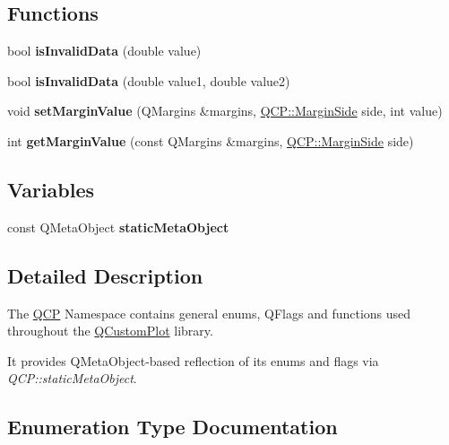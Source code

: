\subsection*{Functions}
\begin{DoxyCompactItemize}
\item 
\mbox{\label{namespaceQCP_a07ab701c05329089f933b9cae2638a63}} 
bool {\bfseries is\+Invalid\+Data} (double value)
\item 
\mbox{\label{namespaceQCP_a728903e5c3dd17847bee280f4005496f}} 
bool {\bfseries is\+Invalid\+Data} (double value1, double value2)
\item 
\mbox{\label{namespaceQCP_afbf6e3084c108f2bb4372107945ee82f}} 
void {\bfseries set\+Margin\+Value} (Q\+Margins \&margins, \hyperlink{namespaceQCP_a7e487e3e2ccb62ab7771065bab7cae54}{Q\+C\+P\+::\+Margin\+Side} side, int value)
\item 
\mbox{\label{namespaceQCP_a23a2679d3495c444acc26acc61e35b5b}} 
int {\bfseries get\+Margin\+Value} (const Q\+Margins \&margins, \hyperlink{namespaceQCP_a7e487e3e2ccb62ab7771065bab7cae54}{Q\+C\+P\+::\+Margin\+Side} side)
\end{DoxyCompactItemize}
\subsection*{Variables}
\begin{DoxyCompactItemize}
\item 
\mbox{\label{namespaceQCP_a07ffa1eb1537a3b1f218ff2a442b2017}} 
const Q\+Meta\+Object {\bfseries static\+Meta\+Object}
\end{DoxyCompactItemize}


\subsection{Detailed Description}
The \hyperlink{namespaceQCP}{Q\+CP} Namespace contains general enums, Q\+Flags and functions used throughout the \hyperlink{classQCustomPlot}{Q\+Custom\+Plot} library.

It provides Q\+Meta\+Object-\/based reflection of its enums and flags via {\itshape Q\+C\+P\+::static\+Meta\+Object}. 

\subsection{Enumeration Type Documentation}
\mbox{\label{namespaceQCP_ae55dbe315d41fe80f29ba88100843a0c}} 
